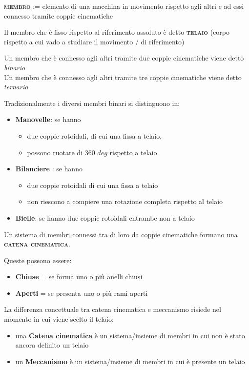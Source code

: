 {\scshape{\bfseries membro}} := elemento di una macchina in movimento rispetto agli altri e ad essi connesso tramite coppie cinematiche

\vspace{2mm}
\noindent Il membro che è fisso rispetto al riferimento assoluto è detto {\scshape{\bfseries telaio}} (corpo rispetto a cui vado a studiare il movimento / di riferimento)

\noindent Un membro che è connesso agli altri tramite due coppie cinematiche viene detto \emph{binario}\\
Un membro che è connesso agli altri tramite tre coppie cinematiche viene detto \emph{ternario}\newline


Tradizionalmente i diversi membri binari si distinguono in:
 \begin{itemize}
 \item \textbf{Manovelle}: se hanno  
 	\begin{itemize} \item due coppie rotoidali, di cui una fissa a telaio,
					\item possono ruotare di 360 $\si{deg}$ rispetto a telaio
		\end{itemize}
		\item \textbf{Bilanciere} : se hanno	
		\begin{itemize}\item due coppie rotoidali di cui una fissa a telaio 
					\item non riescono a compiere una rotazione completa rispetto al telaio
		\end{itemize}
		\item \textbf{Bielle}: se hanno due coppie rotoidali entrambe non a telaio
\end{itemize}

Un sistema di membri connessi tra di loro da coppie cinematiche formano una {\scshape{\bfseries catena cinematica}}.

Queste possono essere:
\begin{itemize}
\item \textbf{Chiuse} = se forma uno o più anelli chiusi
\item \textbf{Aperti} = se presenta uno o più rami aperti
\end{itemize}

La differenza concettuale tra catena cinematica e meccanismo risiede nel momento in cui viene scelto il telaio:
\begin{itemize}
\item una  \textbf{Catena cinematica} è un sistema/insieme di membri in cui non è stato ancora definito un telaio
\item un \textbf{Meccanismo} è un sistema/insieme di membri in cui è presente un telaio
\end{itemize}

